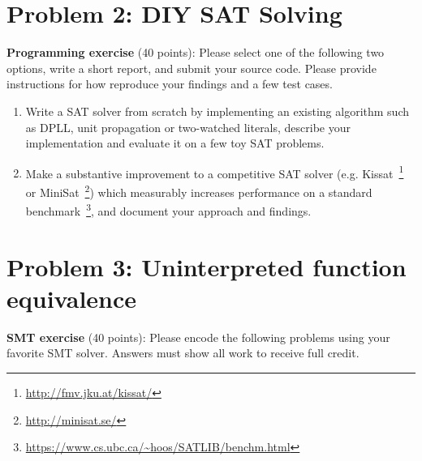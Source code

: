 \documentclass[11pt]{article}
\begin{document}
    \section{Problem 2: DIY SAT Solving}

    \noindent \textbf{Programming exercise} (40 points): Please select one of the following two options, write a short report, and submit your source code. Please provide instructions for how reproduce your findings and a few test cases.

    \begin{enumerate}
        \item Write a SAT solver from scratch by implementing an existing algorithm such as DPLL, unit propagation or two-watched literals, describe your implementation and evaluate it on a few toy SAT problems.
        \item Make a substantive improvement to a competitive SAT solver (e.g. Kissat~\footnote{\url{http://fmv.jku.at/kissat/}} or MiniSat~\footnote{\url{http://minisat.se/}}) which measurably increases performance on a standard benchmark~\footnote{\url{https://www.cs.ubc.ca/~hoos/SATLIB/benchm.html}}, and document your approach and findings.
    \end{enumerate}

    \section {Problem 3: Uninterpreted function equivalence}

    \noindent \textbf{SMT exercise} (40 points): Please encode the following problems using your favorite SMT solver. Answers must show all work to receive full credit.\\
\end{document}
